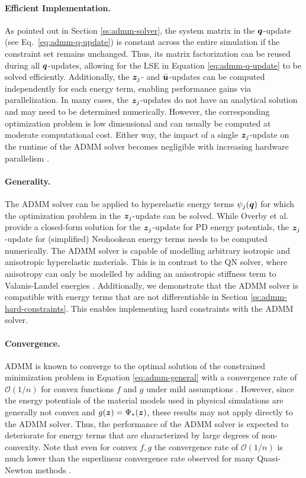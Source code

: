 \paragraph{Efficient Implementation.}
As pointed out in Section \ref{ss:admm-solver}, the system matrix in the $\bm{q}$-update (see Eq.\ 
\ref{eq:admm-q-update}) is constant across the entire simulation if the constraint set remains unchanged. Thus, its matrix factorization can be reused during 
all $\bm{q}$-updates, allowing for the LSE in Equation \ref{eq:admm-q-update} to be solved efficiently. Additionally, the $\bm{z}_j$- and 
$\bar{\bm{u}}$-updates can be computed independently for each energy term, enabling performance gains via parallelization. In many cases, the 
$\bm{z}_j$-updates do not have an analytical solution and may need to be determined numerically. However, the corresponding optimization problem is low 
dimensional and can usually be computed at moderate computational cost. Either way, the impact of a single $\bm{z}_j$-update on the runtime of the ADMM solver
becomes negligible with increasing hardware parallelism \cite{overby2017}.

\paragraph{Generality.}
The ADMM solver can be applied to hyperelastic energy terms $\psi_j(\bm{q})$ for which the optimization problem in the $\bm{z}_j$-update can be 
solved. While Overby et al.\ \cite{overby2017} provide a closed-form solution for the $\bm{z}_j$-update for PD energy potentials, the $\bm{z}_j$-update for 
(simplified) Neohookean energy terms needs to be computed numerically. The ADMM solver is capable of modelling arbitrary isotropic and anisotropic hyperelastic 
materials. This is in contrast to the QN solver, where anisotropy can only be modelled by adding an anisotropic stiffness term to Valanis-Landel energies 
\cite{liu2017}. Additionally, we demonstrate that the ADMM solver is compatible with energy terms that are not differentiable in Section \ref{ss:admm-hard-constraints}. 
This enables implementing hard constraints with the ADMM solver.

\paragraph{Convergence.}
ADMM is known to converge to the optimal solution of the constrained minimization problem in Equation \ref{eq:admm-general} with a convergence rate of $\mathcal{O}(1/n)$
for convex functions $f$ and $g$ under mild assumptions \cite{overby2017}. However, since the energy potentials of the material models used in physical simulations are 
generally not convex and $g(\bm{z}) = \Psi_*(\bm{z})$, these results may not apply directly to the ADMM solver. Thus, the performance of the ADMM solver is expected 
to deteriorate for energy terms that are characterized by large degrees of non-convexity. Note that even for convex $f, g$ the convergence rate of $\mathcal{O}(1/n)$ is 
much lower than the superlinear convergence rate observed for many Quasi-Newton methods \cite{nocedal2006}.

